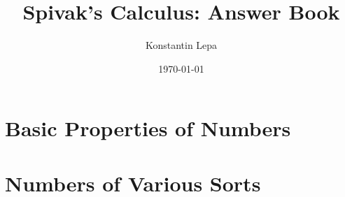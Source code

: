 \documentclass[reqno]{amsbook}
\title{Spivak's Calculus: Answer Book}
\author{Konstantin Lepa}
\date{\today}
\begin{document}
\begin{preview}

	\maketitle

	\Newpage
	\chapter{Basic Properties of Numbers}
	\label{nprop}

	\Newpage
	

	\Newpage
	\chapter{Numbers of Various Sorts}
	\label{nvar}

	\Newpage
	


	\Newpage
	\begin{thebibliography}{99}
		\bibspivak
	\end{thebibliography}
\end{preview}
\end{document}

